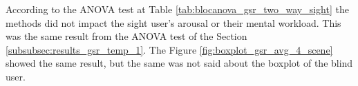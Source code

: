 %
%

According to the ANOVA test at Table \ref{tab:blocanova_gsr_two_way_sight} the methods did not impact the sight user's arousal or their mental workload. This was the same result from the ANOVA test of the Section \ref{subsubsec:results_gsr_temp_1}. The Figure \ref{fig:boxplot_gsr_avg_4_scene} showed the same result, but the same was not said about the boxplot of the blind user.

\FloatBarrier